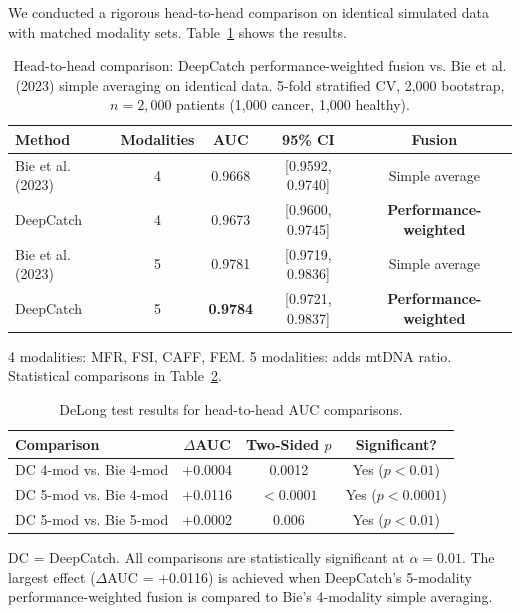 \documentclass[10pt,a4paper]{article}
\begin{document}
We conducted a rigorous head-to-head comparison on identical simulated data with matched modality sets. Table~\ref{tab:head_to_head} shows the results.

\begin{table}[H]
\centering
\caption{Head-to-head comparison: DeepCatch performance-weighted fusion vs. Bie et al. (2023) simple averaging on identical data. 5-fold stratified CV, 2,000 bootstrap, $n = 2,000$ patients (1,000 cancer, 1,000 healthy).}
\label{tab:head_to_head}
\begin{tabular}{l c c c c}
\toprule
\textbf{Method} & \textbf{Modalities} & \textbf{AUC} & \textbf{95\% CI} & \textbf{Fusion} \\
\midrule
Bie et al. (2023) & 4 & 0.9668 & [0.9592, 0.9740] & Simple average \\
DeepCatch & 4 & 0.9673 & [0.9600, 0.9745] & \textbf{Performance-weighted} \\
\midrule
Bie et al. (2023) & 5 & 0.9781 & [0.9719, 0.9836] & Simple average \\
DeepCatch & 5 & \textbf{0.9784} & [0.9721, 0.9837] & \textbf{Performance-weighted} \\
\bottomrule
\end{tabular}
\vspace{0.3cm}
\footnotesize{4 modalities: MFR, FSI, CAFF, FEM. 5 modalities: adds mtDNA ratio. Statistical comparisons in Table~\ref{tab:delong}.}
\end{table}

\begin{table}[H]
\centering
\caption{DeLong test results for head-to-head AUC comparisons.}
\label{tab:delong}
\begin{tabular}{l c c c}
\toprule
\textbf{Comparison} & \textbf{$\Delta$AUC} & \textbf{Two-Sided $p$} & \textbf{Significant?} \\
\midrule
DC 4-mod vs. Bie 4-mod & +0.0004 & 0.0012 & Yes ($p < 0.01$) \\
DC 5-mod vs. Bie 4-mod & +0.0116 & $< 0.0001$ & Yes ($p < 0.0001$) \\
DC 5-mod vs. Bie 5-mod & +0.0002 & 0.006 & Yes ($p < 0.01$) \\
\bottomrule
\end{tabular}
\vspace{0.3cm}
\footnotesize{DC = DeepCatch. All comparisons are statistically significant at $\alpha = 0.01$. The largest effect ($\Delta$AUC = +0.0116) is achieved when DeepCatch's 5-modality performance-weighted fusion is compared to Bie's 4-modality simple averaging.}
\end{table}
\end{document}
